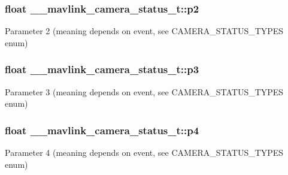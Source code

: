\hypertarget{struct____mavlink__camera__status__t_a03b8078bfb07bf7b94c8980cf85a020d}{
\subsubsection[{p2}]{\setlength{\rightskip}{0pt plus 5cm}float \+\_\+\+\_\+mavlink\+\_\+camera\+\_\+status\+\_\+t\+::p2}}\label{struct____mavlink__camera__status__t_a03b8078bfb07bf7b94c8980cf85a020d}


Parameter 2 (meaning depends on event, see C\+A\+M\+E\+R\+A\+\_\+\+S\+T\+A\+T\+U\+S\+\_\+\+T\+Y\+P\+E\+S enum) 

\hypertarget{struct____mavlink__camera__status__t_a0314b46e082251d221c7c3ea10129aae}{
\subsubsection[{p3}]{\setlength{\rightskip}{0pt plus 5cm}float \+\_\+\+\_\+mavlink\+\_\+camera\+\_\+status\+\_\+t\+::p3}}\label{struct____mavlink__camera__status__t_a0314b46e082251d221c7c3ea10129aae}


Parameter 3 (meaning depends on event, see C\+A\+M\+E\+R\+A\+\_\+\+S\+T\+A\+T\+U\+S\+\_\+\+T\+Y\+P\+E\+S enum) 

\hypertarget{struct____mavlink__camera__status__t_a98d593c668bd59529d4d8bc6ed8697d9}{
\subsubsection[{p4}]{\setlength{\rightskip}{0pt plus 5cm}float \+\_\+\+\_\+mavlink\+\_\+camera\+\_\+status\+\_\+t\+::p4}}\label{struct____mavlink__camera__status__t_a98d593c668bd59529d4d8bc6ed8697d9}


Parameter 4 (meaning depends on event, see C\+A\+M\+E\+R\+A\+\_\+\+S\+T\+A\+T\+U\+S\+\_\+\+T\+Y\+P\+E\+S enum) 

